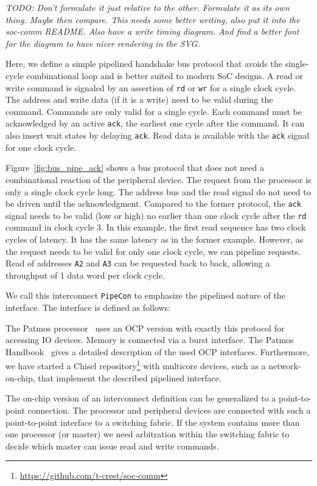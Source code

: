 \documentclass[%
    10pt,
    headinclude, footexclude,
    openright, %
    notitlepage,
    cleardoubleempty,
    headsepline,
    pointlessnumbers,
    bibtotoc, idxtotoc,
    ]{scrbook}
\newcommand{\code}[1]{{\lstinline[basicstyle=\small\ttfamily]{#1}}}
\newcommand{\todo}[1]{{\emph{TODO: #1}}}
\newcommand{\myref}[2]{\href{#1}{#2}}
\renewcommand{\myref}[2]{{#2}{\footnote{\url{#1}}}}
\begin{document}
\todo{Don't formulate it just relative to the other. Formulate it as its own thing.
Maybe then compare. This needs some better writing, also put it into the soc-comm README.
Also have a write timing diagram. And find a better font for the diagram to have nicer
rendering in the SVG.}

Here, we define a simple pipelined handshake bus protocol that avoids the single-cycle combinational loop and is better suited to modern SoC designs.
 A read or write command is signaled by an assertion of \code{rd} or \code{wr}
 for a single clock cycle.
The address and write data (if it is a write) need to be valid during
the command. Commands are only valid for a single cycle.
Each command must be acknowledged by an active \code{ack},
the earliest one cycle after the command. It can also insert wait
states by delaying \code{ack}. Read data is available with the \code{ack}
signal for one clock cycle.

Figure~\ref{fig:bus_pipe_ack} shows a bus protocol that does not need
a combinational reaction of the peripheral device. The request from the processor
is only a single clock cycle long. The address bus and the read signal do not need to be driven
until the acknowledgment. Compared to the former protocol, the \code{ack} signal needs to
be valid (low or high)
no earlier than one clock cycle after the \code{rd} command in clock cycle 3.
In this example, the first read sequence has two clock cycles of latency.
It has the same latency as in the former example.
However, as the request needs to be valid for only one clock cycle, we can pipeline
requests. Read of addresses \code{A2} and \code{A3} can be requested back to back,
allowing a throughput of 1 data word per clock cycle.

We call this interconnect \code{PipeCon} to emphasize the pipelined nature of
the interface. The interface is defined as follows:


The Patmos processor~\cite{patmos:rts2018} uses an OCP version with exactly this
protocol for accessing IO devices. Memory is connected via a burst interface.
The Patmos Handbook~\cite{patmos:handbook} gives a detailed description of the
used OCP interfaces.
Furthermore, we have started a
\myref{https://github.com/t-crest/soc-comm}{Chisel repository} with multicore devices, such as
a network-on-chip, that implement the described pipelined interface.

The on-chip version of an interconnect definition can be generalized to a point-to-point
connection. The processor and peripheral devices are connected with such a point-to-point
interface to a switching fabric. If the system contains more than one processor (or master)
we need arbitration within the switching fabric to decide which master can issue
read and write commands.
\end{document}
